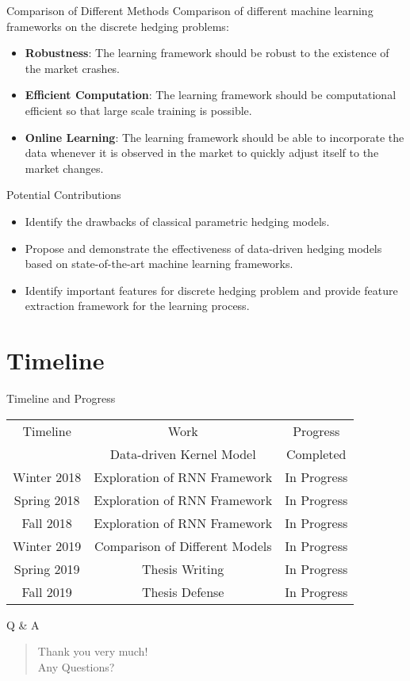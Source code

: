 \documentclass[10pt,table,mathserif]{beamer}
\begin{document}
\begin{frame}{Comparison of Different Methods}
Comparison of different machine learning frameworks on the discrete hedging problems:
\begin{itemize}
  \item \textbf{Robustness}: The learning framework should be robust to the existence of the market crashes.
  \item \textbf{Efficient Computation}: The learning framework should be computational efficient so that large scale training is possible.
  \item \textbf{Online Learning}: The learning framework should be able to incorporate the data whenever it is observed in the market to quickly adjust itself to the market changes.
\end{itemize}
\end{frame}


\begin{frame}{Potential Contributions}
\begin{itemize}
  \item Identify the drawbacks of classical parametric hedging models.
  \item Propose and demonstrate the effectiveness of data-driven hedging models based on state-of-the-art machine learning frameworks.
  \item Identify important features for discrete hedging problem and provide feature extraction framework for the learning process.
\end{itemize}
\end{frame}

\section{Timeline}
\begin{frame}{Timeline and Progress}
\begin{tabular}{|c|c|c|}
  \hline
  \small
  Timeline& Work & Progress\\
   & Data-driven Kernel Model & Completed \footnotemark  \\
   Winter 2018& Exploration of RNN Framework & In Progress\\
   Spring 2018& Exploration of RNN Framework & In Progress\\
   Fall   2018& Exploration of RNN Framework & In Progress\\
   Winter 2019& Comparison of Different Models &In Progress\\
   Spring 2019& Thesis Writing & In Progress\\
   Fall 2019& Thesis Defense & In Progress\\
  \hline
\end{tabular}
\end{frame}

\begin{frame}{Q \& A}
  \LARGE
  \begin{quote}
    \alert{Thank you very much!}\\
    \hspace{8ex} Any Questions?
  \end{quote}
\end{frame}
\end{document}
